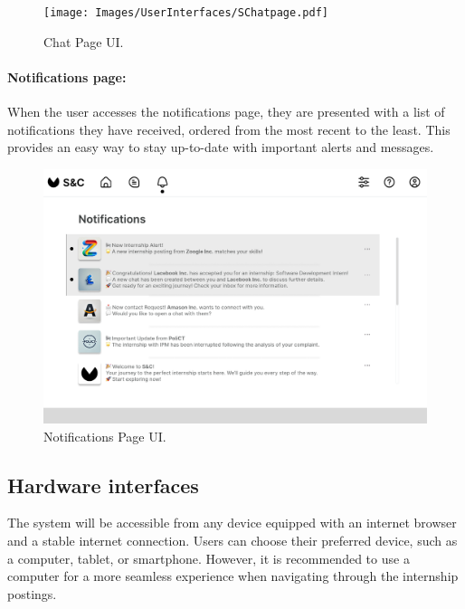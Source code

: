 \begin{figure}[H]
    \begin{center}
        \texttt{[image: Images/UserInterfaces/SChatpage.pdf]}
        \caption{Chat Page UI.}
        \label{fig:chat_page_UI}%
    \end{center}
\end{figure}

\newpage

\paragraph{Notifications page:} When the user accesses the notifications page, they are presented with a list of notifications they have received, ordered from the most recent to the least. This provides an easy way to stay up-to-date with important alerts and messages.

\begin{figure}[H]
    \begin{center}
        \includegraphics[width=\linewidth]{Images/UserInterfaces/NotificationPage.pdf}
        \caption{Notifications Page UI.}
        \label{fig:notifications_page_UI}%
    \end{center}
\end{figure}


\subsection{Hardware interfaces}
\label{subsec:hardware_interfaces}%


The system will be accessible from any device equipped with an internet
browser and a stable internet connection. Users can choose their
preferred device, such as a computer, tablet, or smartphone. However, it
is recommended to use a computer for a more seamless experience when
navigating through the internship postings.


